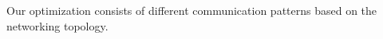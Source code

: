 Our optimization consists of different communication patterns based on the networking topology. 





